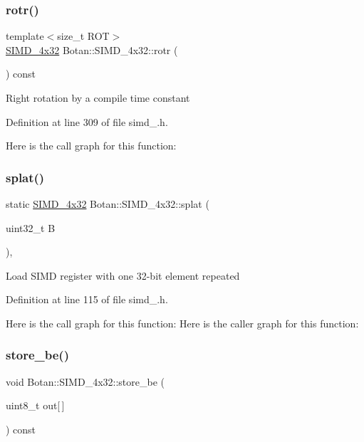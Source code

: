 \subsubsection{\texorpdfstring{rotr()}{rotr()}}
{\footnotesize\ttfamily template$<$size\+\_\+t R\+OT$>$ \\
\mbox{\hyperlink{class_botan_1_1_s_i_m_d__4x32}{S\+I\+M\+D\+\_\+4x32}} Botan\+::\+S\+I\+M\+D\+\_\+4x32\+::rotr (\begin{DoxyParamCaption}{ }\end{DoxyParamCaption}) const\hspace{0.3cm}{\ttfamily [inline]}}

Right rotation by a compile time constant 

Definition at line 309 of file simd\+\_.\+h.

Here is the call graph for this function\+:
\mbox{\label{class_botan_1_1_s_i_m_d__4x32_a2d92ac1bb185cb89e5e4d413f5ef6d34}} 
\subsubsection{\texorpdfstring{splat()}{splat()}}
{\footnotesize\ttfamily static \mbox{\hyperlink{class_botan_1_1_s_i_m_d__4x32}{S\+I\+M\+D\+\_\+4x32}} Botan\+::\+S\+I\+M\+D\+\_\+4x32\+::splat (\begin{DoxyParamCaption}\item[{uint32\+\_\+t}]{B }\end{DoxyParamCaption})\hspace{0.3cm}{\ttfamily [inline]}, {\ttfamily [static]}}

Load S\+I\+MD register with one 32-\/bit element repeated 

Definition at line 115 of file simd\+\_.\+h.

Here is the call graph for this function\+:
Here is the caller graph for this function\+:
\mbox{\label{class_botan_1_1_s_i_m_d__4x32_ac421365de5827557c16aa89097e15504}} 
\subsubsection{\texorpdfstring{store\+\_\+be()}{store\_be()}}
{\footnotesize\ttfamily void Botan\+::\+S\+I\+M\+D\+\_\+4x32\+::store\+\_\+be (\begin{DoxyParamCaption}\item[{uint8\+\_\+t}]{out\mbox{[}$\,$\mbox{]} }\end{DoxyParamCaption}) const\hspace{0.3cm}{\ttfamily [inline]}}

